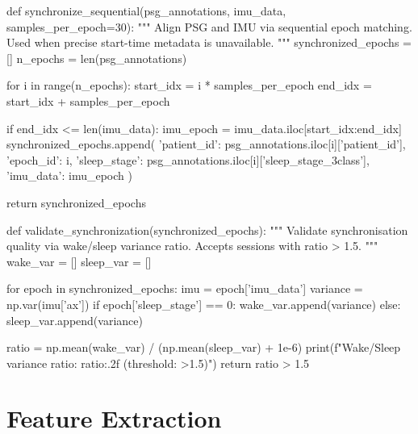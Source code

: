 \begin{pycode}
def synchronize_sequential(psg_annotations, imu_data,
                            samples_per_epoch=30):
    """
    Align PSG and IMU via sequential epoch matching.
    Used when precise start-time metadata is unavailable.
    """
    synchronized_epochs = []
    n_epochs = len(psg_annotations)

    for i in range(n_epochs):
        start_idx = i * samples_per_epoch
        end_idx   = start_idx + samples_per_epoch

        if end_idx <= len(imu_data):
            imu_epoch = imu_data.iloc[start_idx:end_idx]
            synchronized_epochs.append({
                'patient_id':  psg_annotations.iloc[i]['patient_id'],
                'epoch_id':    i,
                'sleep_stage': psg_annotations.iloc[i]['sleep_stage_3class'],
                'imu_data':    imu_epoch
            })

    return synchronized_epochs
\end{pycode}

\begin{pycode}
def validate_synchronization(synchronized_epochs):
    """
    Validate synchronisation quality via wake/sleep variance ratio.
    Accepts sessions with ratio > 1.5.
    """
    wake_var  = []
    sleep_var = []

    for epoch in synchronized_epochs:
        imu      = epoch['imu_data']
        variance = np.var(imu['ax'])
        if epoch['sleep_stage'] == 0:
            wake_var.append(variance)
        else:
            sleep_var.append(variance)

    ratio = np.mean(wake_var) / (np.mean(sleep_var) + 1e-6)
    print(f"Wake/Sleep variance ratio: {ratio:.2f}  (threshold: >1.5)")
    return ratio > 1.5
\end{pycode}


\section{Feature Extraction}
\label{app:feature_extraction}


